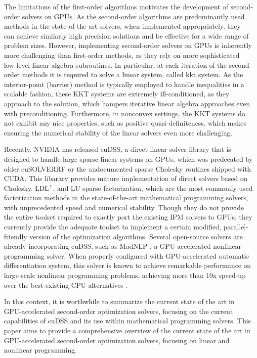 \documentclass{article}
\begin{document}
The limitations of the first-order algorithms motivates the development of second-order solvers on GPUs.
As the second-order algorithms are predominantly used methods in the state-of-the-art solvers, when implemented appropriately, they can achieve similarly high precision solutions and be effective for a wide range of problem sizes.
However, implementing second-order solvers on GPUs is inherently more challenging than first-order methods, as they rely on more sophisticated low-level linear algebra subroutines.
In particular, at each iteration of the second-order methods it is required to solve a linear system, called \gls{kkt} system.
As the interior-point (barrier) method is typically employed to handle inequalities in a scalable fashion, these KKT systems are extremely ill-conditioned, as they approach to the solution, which hampers iterative linear algebra approaches even with preconditioning.
Furthermore, in nonconvex settings, the KKT systems do not exhibit any nice properties, such as positive quasi-definiteness, which makes ensuring the numerical stability of the linear solvers even more challenging.

Recently, NVIDIA has released cuDSS, a direct linear solver library that is designed to handle large sparse linear systems on GPUs, which was predecated by older cuSOLVERRF or the undocumented sparse Cholesky routines shipped with CUDA.
This libarary provides mature implementation of direct solvers based on Cholesky, LDL$^\top$, and LU sparse factorization, which are the most commonly used factorization methods in the state-of-the-art mathematical programming solvers, with unprecedented speed and numerical stability.
Though they do not provide the entire toolset required to exactly port the existing IPM solvers to GPUs, they currently provide the adequate toolset to implement a certain modified, parallel-friendly version of the optimization algorithms.
Several open-source solvers are already incorporating cuDSS, such as MadNLP \cite{}, a GPU-accelerated nonlinear programming solver.
When properly configured with GPU-accelerated automatic differentiation system, this solver is known to achieve remarkable performance on large-scale nonlinear programming problems, achieving more than 10x speed-up over the best existing CPU alternatives \cite{}.

In this context, it is worthwhile to summarize the current state of the art in GPU-accelerated second-order optimization solvers, focusing on the current capabilities of cuDSS and its use within mathematical programming solvers.
This paper aims to provide a comprehensive overview of the current state of the art in GPU-accelerated second-order optimization solvers, focusing on linear and nonlinear programming.
\end{document}
